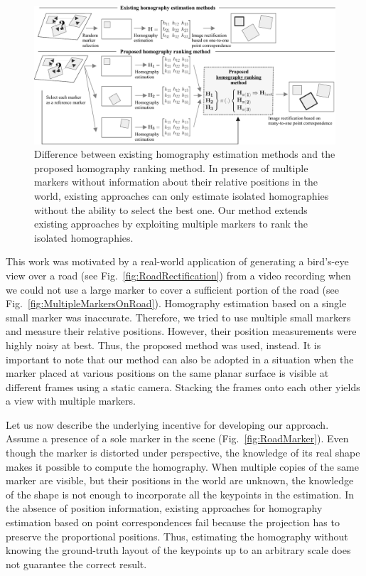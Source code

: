 \begin{figure}[t]
    \centerline{\includegraphics[width=\linewidth]{figures/homography/motivation_diagram.pdf}}
    \caption[Homography ranking motivation diagram]{Difference between existing homography estimation methods and the proposed homography ranking method. In presence of multiple markers without information about their relative positions in the world, existing approaches can only estimate isolated homographies without the ability to select the best one. Our method extends existing approaches by exploiting multiple markers to rank the isolated homographies.}
    \label{fig:HomographyMotivationDiagram}
\end{figure}

This work was motivated by a real-world application of generating a bird's-eye view over a road (see Fig.~\ref{fig:RoadRectification}) from a video recording when we could not use a large marker to cover a sufficient portion of the road (see Fig.~\ref{fig:MultipleMarkersOnRoad}). Homography estimation based on a single small marker was inaccurate. Therefore, we tried to use multiple small markers and measure their relative positions. However, their position measurements were highly noisy at best. Thus, the proposed method was used, instead. It is important to note that our method can also be adopted in a situation when the marker placed at various positions on the same planar surface is visible at different frames using a static camera. Stacking the frames onto each other yields a view with multiple markers.

Let us now describe the underlying incentive for developing our approach. Assume a presence of a sole marker in the scene (Fig.~\ref{fig:RoadMarker}). Even though the marker is distorted under perspective, the knowledge of its real shape makes it possible to compute the homography. When multiple copies of the same marker are visible, but their positions in the world are unknown, the knowledge of the shape is not enough to incorporate all the keypoints in the estimation. In the absence of position information, existing approaches for homography estimation based on point correspondences fail because the projection has to preserve the proportional positions. Thus, estimating the homography without knowing the ground-truth layout of the keypoints up to an arbitrary scale does not guarantee the correct result.

